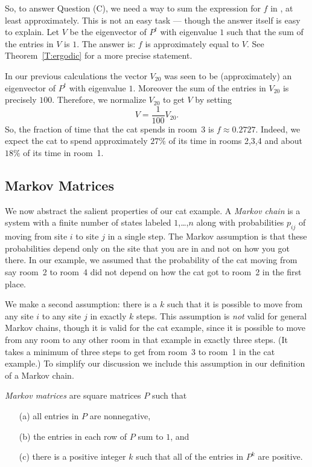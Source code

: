 \documentclass{ximera}
\begin{document}
So, to answer Question (C), we need a way to sum the expression for $f$
in , at least approximately.  This is not an easy task --- though
the answer itself is easy to explain.  Let $V$ be the eigenvector of $P^t$
with eigenvalue $1$ such that the sum of the entries in $V$ is $1$.  The
answer is: $f$ is approximately equal to $V$.  See Theorem~\ref{T:ergodic}
for a more precise statement.

In our previous calculations the vector $V_{20}$ was seen to be (approximately)
an eigenvector of $P^t$ with eigenvalue $1$.  Moreover the sum of the entries
in $V_{20}$ is precisely $100$.  Therefore, we normalize $V_{20}$ to get $V$
by setting
\[
V =\frac{1}{100}V_{20}.
\]
So, the fraction of time that the cat spends in room~3 is $f\approx 0.2727$.
Indeed, we expect the cat to spend approximately $27\%$ of its time in rooms
2,3,4 and about $18\%$ of its time in room~1.

\subsection*{Markov Matrices}

We now abstract the salient properties of our cat example.  A
{\em Markov chain\/} is a system with a
finite number of states labeled
$1$,\dots,$n$ along with probabilities $p_{ij}$ of moving from site $i$ to
site $j$ in a single step.  The Markov assumption is that these probabilities
depend only on the site that you are in and not on how you got there.  In our
example, we assumed that the probability of the cat moving from say room~2 to
room~4 did not depend on how the cat got to room~2 in the first place.

We make a second assumption: there is a $k$ such that it is possible to move
from any site $i$ to any site $j$ in exactly $k$ steps.  This assumption is
{\em not\/} valid for general Markov chains, though it is valid for the cat
example, since it is possible to move from any room to any other room in that
example in exactly three steps.  (It takes a minimum of three steps to get
from room~3 to room~1 in the cat example.)  To simplify our discussion we
include this assumption in our definition of a Markov chain.

\begin{Def}  \label{D:Markov}
{\em Markov matrices\/} are square matrices
$P$ such that
\begin{enumerate}
\item[(a)]  all entries in $P$ are nonnegative,
\item[(b)]  the entries in each row of $P$ sum to $1$, and
\item[(c)]  there is a positive integer $k$ such that all of the entries
	in $P^k$ are positive.
\end{enumerate}
\end{Def}
\end{document}
